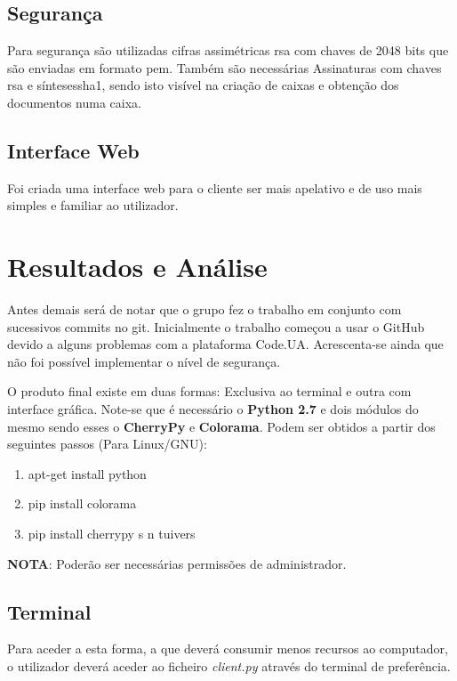 \documentclass{report}
\begin{document}
\section{Segurança}
Para segurança são utilizadas cifras assimétricas \ac{rsa} com chaves de 2048 bits que são enviadas em formato \ac{pem}. Também são necessárias Assinaturas com chaves \ac{rsa} e sínteses{sha1}, sendo isto visível na criação de caixas e obtenção dos documentos numa caixa.

\section{Interface Web}
Foi criada uma interface web para o cliente ser mais apelativo e de uso mais simples e familiar ao utilizador.

\chapter{Resultados e Análise}
\label{chap.res}

Antes demais será de notar que o grupo fez o trabalho em conjunto com sucessivos commits no git. Inicialmente o trabalho começou a usar o GitHub devido a alguns problemas com a plataforma Code.UA. Acrescenta-se ainda que não foi possível implementar o nível de segurança.

O produto final existe em duas formas: Exclusiva ao terminal e outra com interface gráfica. Note-se que é necessário o \textbf{Python 2.7} e dois módulos do mesmo sendo esses o \textbf{CherryPy} e \textbf{Colorama}. Podem ser obtidos a partir dos seguintes passos (Para Linux/GNU):

\begin{enumerate}
\item apt-get install python 
\item pip install colorama
\item pip install cherrypy s n tuivers
\end{enumerate}

\textbf{NOTA}: Poderão ser necessárias permissões de administrador.

\section{Terminal}

Para aceder a esta forma, a que deverá consumir menos recursos ao computador, o utilizador deverá aceder ao ficheiro \textit{client.py} através do terminal de preferência.
\end{document}
